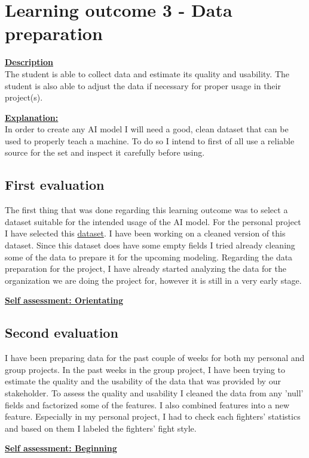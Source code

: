 \documentclass{article}
\begin{document}
	\section{Learning outcome 3 - Data preparation}
	\underline{\textbf{Description}}\\
	The student is able to collect data and estimate its quality and usability. 
	The student is also able to adjust the data if necessary for proper usage in their project(s).
	
	\underline{\textbf{Explanation:}}\\
	In order to create any AI model I will need a good, clean dataset that can be used to properly teach a machine.
	To do so I intend to first of all use a reliable source for the set and inspect it carefully before using.
	
	\subsection{First evaluation}
	The first thing that was done regarding this learning outcome was to select a dataset suitable for the intended usage of the 
	AI model. For the personal project I have selected this \href{https://www.kaggle.com/datasets/asaniczka/ufc-fighters-statistics}{dataset}. I have been working on a cleaned version of this dataset. 
	Since this dataset does have some empty fields I tried already cleaning some of the data to prepare it for the upcoming modeling. Regarding the data preparation 
	for the project, I have already started analyzing the data for the organization we are doing the project for, however it is still in a very early stage.
	
	\underline{\textbf{Self assessment: Orientating}}
	
	\subsection{Second evaluation}
	I have been preparing data for the past couple of weeks for both my personal and group projects. In the past weeks in the group project, I have been 
	trying to estimate the quality and the usability of the data that was provided by our stakeholder. To assess the quality and usability I cleaned 
	the data from any 'null' fields and factorized some of the features. I also combined features into a new feature. Especially in my personal 
	project, I had to check each fighters' statistics and based on them I labeled the fighters' fight style.
	
	\underline{\textbf{Self assessment: Beginning}}
	
\end{document}
